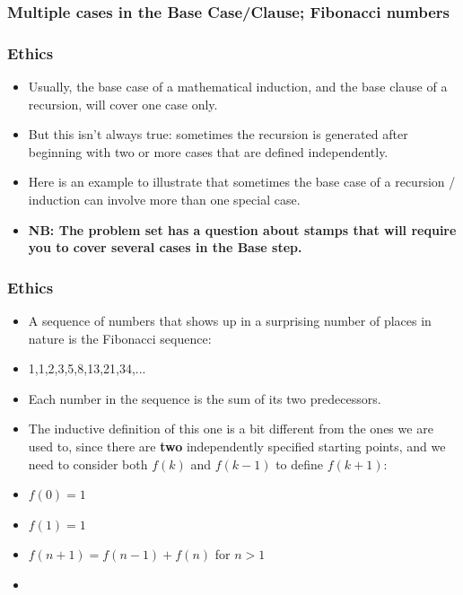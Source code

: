  \subsubsection{Multiple cases in the Base Case/Clause; Fibonacci numbers}

\begin{frame}
\frametitle{Ethics}

\begin{itemize}[<+->]
\item Usually, the base case of a mathematical induction, and the base clause of a recursion, will cover one case only.
\item  
But this isn't always true: sometimes the recursion is generated after beginning with two or more cases that are defined independently.

\item Here is an example to illustrate that sometimes the base case of a recursion / induction can involve more than one special case.

\item {\bf{NB: The problem set has a question about stamps that will require you to cover several cases in the Base step.}}

\end{itemize} 
\end{frame}


\begin{frame}
\frametitle{Ethics}

\begin{itemize}[<+->]
\item 
A sequence of numbers that shows up in a surprising number of places in nature is the Fibonacci sequence:

\item \medskip

1,1,2,3,5,8,13,21,34,...

\item \medskip

\noindent Each number in the sequence is the sum of its two predecessors.

\item The inductive definition of this one
is a bit different from the ones we are used to, since there are {\bf{two}} independently specified starting points, and we need to consider both $f(k)$ and $f(k-1)$
to define $f(k+1)$:

\item \noindent $f(0) = 1$ 
\item $f(1) = 1$ 
\item $f(n+1) = f(n-1) + f(n)$ for $n>1$

\item 
\end{itemize} 
\end{frame}



